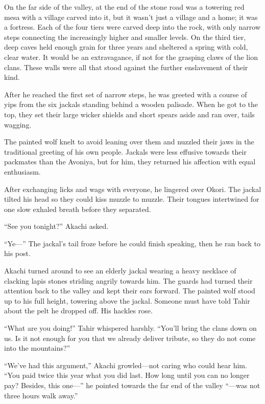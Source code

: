 On the far side of the valley, at the end of the stone road was a towering red mesa with a village carved into it, but it wasn't just a village and a home; it was a fortress. Each of the four tiers were carved deep into the rock, with only narrow steps connecting the increasingly higher and smaller levels. On the third tier, deep caves held enough grain for three years and sheltered a spring with cold, clear water. It would be an extravagance, if not for the grasping claws of the lion clans. These walls were all that stood against the further enslavement of their kind.

After he reached the first set of narrow steps, he was greeted with a course of yips from the six jackals standing behind a wooden palisade. When he got to the top, they set their large wicker shields and short spears aside and ran over, tails wagging.

The painted wolf knelt to avoid leaning over them and nuzzled their jaws in the traditional greeting of his own people. Jackals were less effusive towards their packmates than the Avoniya, but for him, they returned his affection with equal enthusiasm.

After exchanging licks and wags with everyone, he lingered over Okori. The jackal tilted his head so they could kiss muzzle to muzzle. Their tongues intertwined for one slow exhaled breath before they separated.

``See you tonight?'' Akachi asked.

``Ye---'' The jackal's tail froze before he could finish speaking, then he ran back to his post.

Akachi turned around to see an elderly jackal wearing a heavy necklace of clacking lapis stones striding angrily towards him. The guards had turned their attention back to the valley and kept their ears forward. The painted wolf stood up to his full height, towering above the jackal. Someone must have told Tahir about the pelt he dropped off. His hackles rose.

``What are you doing!'' Tahir whispered harshly. ``You'll bring the clans down on us. Is it not enough for you that we already deliver tribute, so they do not come into the mountains?''

``We've had this argument,'' Akachi growled---not caring who could hear him. ``You paid twice this year what you did last. How long until you can no longer pay? Besides, this one---'' he pointed towards the far end of the valley ``---was not three hours walk away.''

